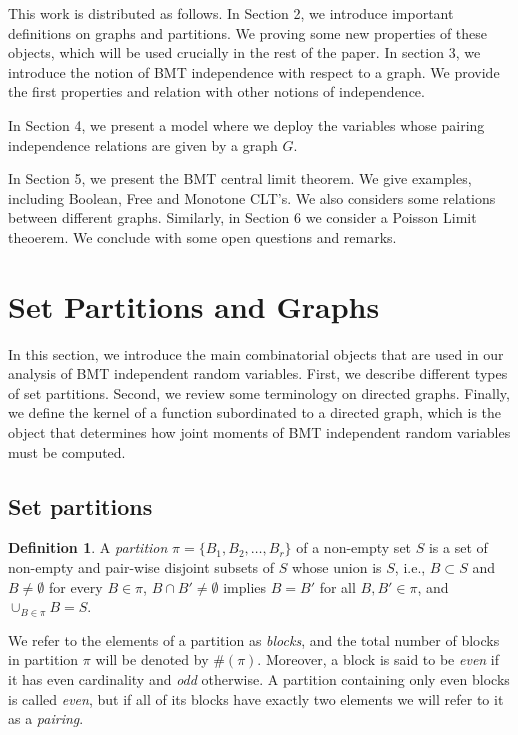 \documentclass[a4paper,12pt]{extarticle}
\theoremstyle{definition}
\newtheorem{defn}[thm]{Definition}
\theoremstyle{remark}
\begin{document}


This work is distributed as follows. In Section 2, we introduce important definitions on graphs and partitions. We proving some new properties of these objects, which will be used crucially in the rest of the paper. In section 3, we introduce the notion of BMT independence with respect to a graph. We provide the first properties and relation with other notions of independence.

In Section 4, we present a model where we deploy the variables whose pairing independence relations are given by a graph $G$.

In Section 5, we present the BMT central limit theorem. We give examples, including Boolean, Free and Monotone CLT's. We also considers some relations between different graphs. Similarly, in Section 6 we consider a Poisson Limit theoerem. We conclude with some open questions and remarks.


%


\section{Set Partitions and Graphs}

%
In this section, we introduce the main combinatorial objects that are used in our analysis of BMT independent random variables. 
%
First, we describe different types of set partitions. 
%
Second, we review some terminology on directed graphs. 
%
Finally, we define the kernel of a function subordinated to a directed graph, which is the object that determines how joint moments of BMT independent random variables must be computed. 
%
%
%
%
%

\subsection{Set partitions}

\begin{defn}
%
A \emph{partition} $\pi = \{ B_1, B_2, \ldots, B_r\}$ of a non-empty set $S$ is a set of non-empty and pair-wise disjoint subsets of $S$ whose union is $S$,
% 
i.e., $B \subset S$ and $B \neq \emptyset$  for every $B \in \pi$, $B\cap B' \neq \emptyset$ implies $B=B'$ for all $B,B'\in \pi$, and $\cup_{B \in \pi } B = S$. 
% 
\end{defn}
%
We refer to the elements of a partition as \emph{blocks}, and  
%
the total number of blocks in partition $\pi$ will be denoted by $\#(\pi)$. 
%
Moreover, a block is said to be \emph{even} if it has even cardinality and \emph{odd} otherwise. 
%
A partition containing only even blocks is called \emph{even}, but if all of its blocks have exactly two elements we will refer to it as a \emph{pairing}.  
%
%
%
%
%
\end{document}
